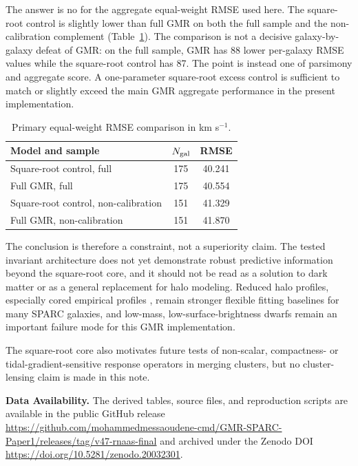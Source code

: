 \documentclass[RNAAS]{aastex701}
\begin{document}
The answer is no for the aggregate equal-weight RMSE used here. The square-root control is slightly lower than full GMR on both the full sample and the non-calibration complement (Table~\ref{tab:metrics}). The comparison is not a decisive galaxy-by-galaxy defeat of GMR: on the full sample, GMR has 88 lower per-galaxy RMSE values while the square-root control has 87. The point is instead one of parsimony and aggregate score. A one-parameter square-root excess control is sufficient to match or slightly exceed the main GMR aggregate performance in the present implementation.

\begin{table}[h]
\centering
\caption{Primary equal-weight RMSE comparison in km s$^{-1}$.}
\label{tab:metrics}
\begin{tabular}{lcc}
\hline
Model and sample & $N_{\rm gal}$ & RMSE \\
\hline
Square-root control, full & 175 & 40.241\\
Full GMR, full & 175 & 40.554\\
Square-root control, non-calibration & 151 & 41.329\\
Full GMR, non-calibration & 151 & 41.870\\
\hline
\end{tabular}
\end{table}

The conclusion is therefore a constraint, not a superiority claim. The tested invariant architecture does not yet demonstrate robust predictive information beyond the square-root core, and it should not be read as a solution to dark matter or as a general replacement for halo modeling. Reduced halo profiles, especially cored empirical profiles \citep[e.g.,][]{burkert1995}, remain stronger flexible fitting baselines for many SPARC galaxies, and low-mass, low-surface-brightness dwarfs remain an important failure mode for this GMR implementation.

The square-root core also motivates future tests of non-scalar, compactness- or tidal-gradient-sensitive response operators in merging clusters, but no cluster-lensing claim is made in this note.

\par\medskip\noindent\textbf{Data Availability.}
The derived tables, source files, and reproduction scripts are available in the public GitHub release \url{https://github.com/mohammedmessaoudene-cmd/GMR-SPARC-Paper1/releases/tag/v47-rnaas-final} and archived under the Zenodo DOI \url{https://doi.org/10.5281/zenodo.20032301}.
\end{document}
